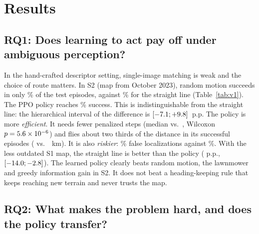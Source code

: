 \section{Results}
\label{sec:results}

\subsection{RQ1: Does learning to act pay off under ambiguous perception?}
\label{sec:rq1}

In the hand-crafted descriptor setting, single-image matching is weak and the choice of route matters. In S2 (map from October 2023), random motion succeeds in only \vOneSuccRandomSTwo\% of the test episodes, against \vOneSuccStraightSTwo\% for the straight line (Table~\ref{tab:v1}).
The PPO policy reaches \vOneSuccessPpoSTwo\% success. This is indistinguishable from the straight line: the hierarchical interval of the difference is $[-7.1; +9.8]$~p.p.
The policy is more \emph{efficient}. It needs fewer penalized steps (median \vOnePenStepsPpo{} vs.\ \vOnePenStepsStraight, Wilcoxon $p=5.6\times10^{-6}$) and flies about two thirds of the distance in its successful episodes (\vOneDistSuccessPpoSTwo{} vs.\ \vOneDistSuccessStraightSTwo~km).
It is also \emph{riskier}: \vOneFalseLocPpoSTwo\% false localizations against \vOneFalseLocStraightSTwo\%.
With the less outdated S1 map, the straight line is better than the policy (\vOneDiffPpoStraightSOne{} p.p., $[-14.0; -2.8]$).
The learned policy clearly beats random motion, the lawnmower and greedy information gain in S2. It does not beat a heading-keeping rule that keeps reaching new terrain and never trusts the map.

\begin{table}[t]
\centering
\caption{Hand-crafted descriptor setting, Taquari test band (1000 paired episodes, argmax). $\Delta$: PPO or heuristic minus straight, with hierarchical 95\% CI (seeds $\rightarrow$ windows). Dist.\ succ.: mean flight distance in successful episodes.}
\label{tab:v1}
\footnotesize
\setlength{\tabcolsep}{2.5pt}
\resizebox{\columnwidth}{!}{}
\end{table}

\subsection{RQ2: What makes the problem hard, and does the policy transfer?}
\label{sec:rq2}

